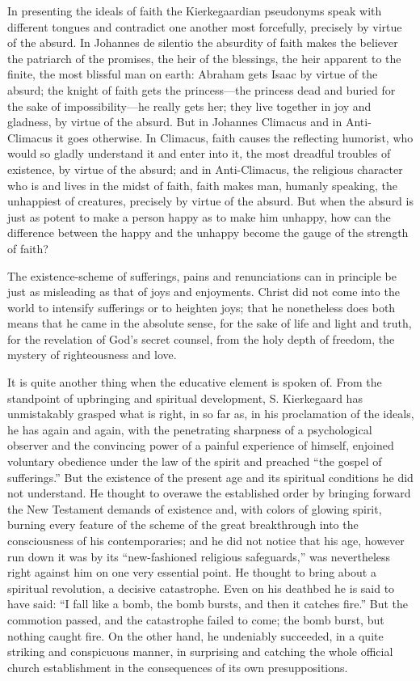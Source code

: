 \documentclass[12pt,a4paper,openany]{book}
\newcommand{\opage}[1]{\marginnote{\footnotesize\textit{[#1]}}}
\begin{document}
In presenting the ideals of faith the Kierkegaardian pseudonyms speak
with different tongues and contradict one another most forcefully,
precisely by virtue of \opage{88}the absurd. In Johannes de silentio the absurdity
of faith makes the believer the patriarch of the promises, the heir of
the blessings, the heir apparent to the finite, the most blissful man on
earth: Abraham gets Isaac by virtue of the absurd; the knight of faith
gets the princess---the princess dead and buried for the sake of
impossibility---he really gets her; they live together in joy and
gladness, by virtue of the absurd. But in Johannes Climacus and in
Anti-Climacus it goes otherwise. In Climacus, faith causes the reflecting
humorist, who would so gladly understand it and enter into it, the most
dreadful troubles of existence, by virtue of the absurd; and in
Anti-Climacus, the religious character who is and lives in the midst of
faith, faith makes man, humanly speaking, the unhappiest of creatures,
precisely by virtue of the absurd. But when the absurd is just as potent
to make a person happy as to make him unhappy, how can the difference
between the happy and the unhappy become the gauge of the strength of
faith?

The existence-scheme of sufferings, pains and renunciations can in
principle be just as misleading as that of joys and enjoyments. Christ
did not come into the world to intensify sufferings or to heighten joys;
that he nonetheless does both means that he came in the absolute sense,
for the sake of life and light and truth, for the revelation of God's
secret counsel, from the holy depth of freedom, the mystery of
righteousness and love.

It is quite another thing when the educative element is spoken of. From
the standpoint of upbringing and spiritual development, S. Kierkegaard
has \opage{89}unmistakably grasped what is right, in so far as, in his proclamation
of the ideals, he has again and again, with the penetrating sharpness of
a psychological observer and the convincing power of a painful
experience of himself, enjoined voluntary obedience under the law of the
spirit and preached ``the gospel of sufferings.''
But the existence of the present age and its spiritual conditions he did
not understand. He thought to overawe the established order by bringing
forward the New Testament demands of existence and, with colors of
glowing spirit, burning every feature of the scheme of the great
breakthrough into the consciousness of his contemporaries; and he did not
notice that his age, however run down it was by its ``new-fashioned
religious safeguards,'' was nevertheless right against him on one very
essential point. He thought to bring about a spiritual revolution, a
decisive catastrophe. Even on his deathbed he is said to have said: ``I
fall like a bomb, the bomb bursts, and then it catches fire.'' But the
commotion passed, and the catastrophe failed to come; the bomb burst, but
nothing caught fire. On the other hand, he undeniably succeeded, in a
quite striking and conspicuous manner, in surprising and catching the
whole official church establishment in the consequences of its own
presuppositions.
\end{document}
